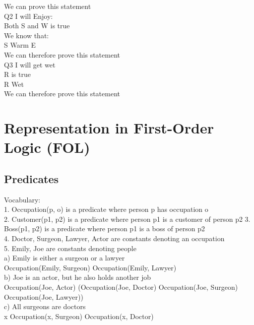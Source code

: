 \documentclass{article}
\begin{document}
\noindent We can prove this statement\\

\noindent Q2 I will Enjoy:\\
Both S and W is true\\
We know that: \\
S \wedge Warm \Rightarrow E\\

\noindent We can therefore prove this statement\\

\noindent Q3 I will get wet\\
R is true\\
R \Rightarrow Wet\\

\noindent We can therefore prove this statement


\section{Representation in First-Order Logic (FOL)}

\subsection{Predicates}

Vocabulary:\\
1. Occupation(p, o) is a predicate where person p has occupation o\\
2. Customer(p1, p2) is a predicate where person p1 is a customer of person p2 3. Boss(p1, p2) is a predicate where person p1 is a boss of person p2\\
4. Doctor, Surgeon, Lawyer, Actor are constants denoting an occupation\\
5. Emily, Joe are constants denoting people\\



a) Emily is either a surgeon or a lawyer\\
Occupation(Emily, Surgeon) \vee Occupation(Emily, Lawyer)\\

b) Joe is an actor, but he also holds another job\\
Occupation(Joe, Actor) \wedge (Occupation(Joe, Doctor) \vee Occupation(Joe, Surgeon) \vee Occupation(Joe, Lawyer))\\

c) All surgeons are doctors\\
\forall x \: Occupation(x, Surgeon) \Rightarrow \: Occupation(x, Doctor)\\
\end{document}
